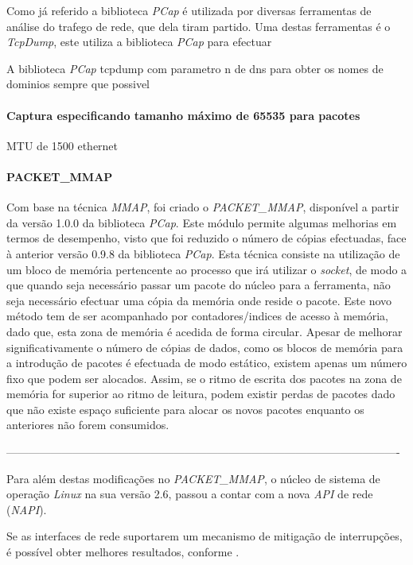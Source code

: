 Como já referido a biblioteca \textit{PCap} é utilizada por diversas ferramentas de análise do trafego de rede, que dela tiram partido.
Uma destas ferramentas é o \textit{TcpDump}, este utiliza a biblioteca \textit{PCap} para efectuar 

A biblioteca \textit{PCap}
tcpdump com parametro n de dns para obter os nomes de dominios sempre que possivel

\paragraph{Captura especificando tamanho máximo de 65535 para pacotes}

MTU de 1500 ethernet

\paragraph*{PACKET\_MMAP}

Com base na técnica \textit{MMAP}, foi criado o \textit{PACKET\_MMAP}, disponível a partir da versão 1.0.0 da biblioteca \textit{PCap}.
Este módulo permite algumas melhorias em termos de desempenho, visto que foi reduzido o número de cópias efectuadas, face à anterior versão 0.9.8 da biblioteca \textit{PCap}.
Esta técnica consiste na utilização de um bloco de memória pertencente ao processo que irá utilizar o \textit{socket}, de modo a que quando seja necessário passar um pacote do núcleo para a ferramenta, não seja necessário efectuar uma cópia da memória onde reside o pacote.
Este novo método tem de ser acompanhado por contadores/indices de acesso à memória, dado que, esta zona de memória é acedida de forma circular.
Apesar de melhorar significativamente o número de cópias de dados, como os blocos de memória para a introdução de pacotes é efectuada de modo estático, existem apenas um número fixo que podem ser alocados.
Assim, se o ritmo de escrita dos pacotes na zona de memória for superior ao ritmo de leitura, podem existir perdas de pacotes dado que não existe espaço suficiente para alocar os novos pacotes enquanto os anteriores não forem consumidos.

----------------------------------------------------------------------------------------------------------

Para além destas modificações no \textit{PACKET\_MMAP}, o núcleo de sistema de operação \textit{Linux} na sua versão 2.6, passou a contar com a nova \textit{API} de rede (\textit{NAPI}).

Se as interfaces de rede suportarem um mecanismo de mitigação de interrupções, é possível obter melhores resultados, conforme \cite{Deri2004}.

